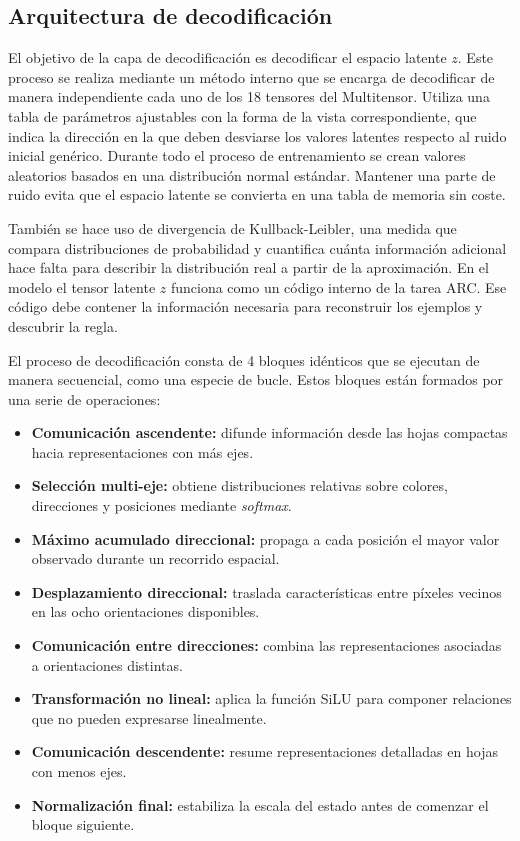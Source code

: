 \documentclass[11pt,a4paper,spanish]{book}
\numberwithin{equation}{chapter}
\numberwithin{figure}{chapter}
\begin{document}
\subsection{Arquitectura de decodificación}

El objetivo de la capa de decodificación es decodificar el espacio latente \(z\). Este proceso se realiza mediante un método interno que
se encarga de decodificar de manera independiente cada uno de los 18 tensores del Multitensor. Utiliza una tabla de parámetros ajustables
con la forma de la vista correspondiente, que indica la dirección en la que deben desviarse los valores latentes respecto al ruido inicial genérico.
Durante todo el proceso de entrenamiento se crean valores aleatorios basados en una distribución normal estándar. Mantener una parte
de ruido evita que el espacio latente se convierta en una tabla de memoria sin coste.

También se hace uso de divergencia de Kullback-Leibler,
una medida que compara distribuciones de probabilidad y cuantifica cuánta información adicional hace falta para describir la distribución 
real a partir de la aproximación. En el modelo el tensor latente \(z\) funciona como un código interno de la tarea ARC. 
Ese código debe contener la información necesaria para reconstruir los ejemplos y descubrir la regla.

El proceso de decodificación consta de 4 bloques idénticos que se ejecutan de manera secuencial, como una especie de bucle. Estos bloques
están formados por una serie de operaciones:

\begin{itemize}
	\item \textbf{Comunicación ascendente:} difunde información desde las hojas compactas hacia representaciones con más ejes.
	\item \textbf{Selección multi-eje:} obtiene distribuciones relativas sobre colores, direcciones y posiciones mediante \textit{softmax}.
	\item \textbf{Máximo acumulado direccional:} propaga a cada posición el mayor valor observado durante un recorrido espacial.
	\item \textbf{Desplazamiento direccional:} traslada características entre píxeles vecinos en las ocho orientaciones disponibles.
	\item \textbf{Comunicación entre direcciones:} combina las representaciones asociadas a orientaciones distintas.
	\item \textbf{Transformación no lineal:} aplica la función SiLU para componer relaciones que no pueden expresarse linealmente.
	\item \textbf{Comunicación descendente:} resume representaciones detalladas en hojas con menos ejes.
	\item \textbf{Normalización final:} estabiliza la escala del estado antes de comenzar el bloque siguiente.
\end{itemize}
\end{document}
